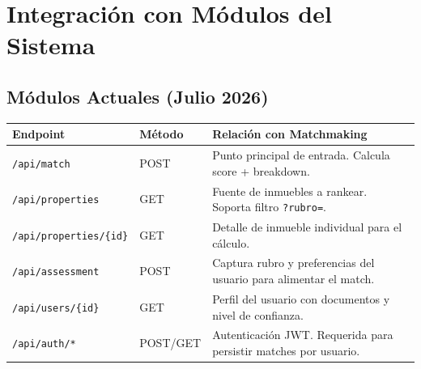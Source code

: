 \documentclass[11pt,a4paper]{article}
\begin{document}
\section{Integración con Módulos del Sistema}

\subsection{Módulos Actuales (Julio 2026)}
\begin{table}[H]
    \centering
    \renewcommand{\arraystretch}{1.2}
    \begin{tabularx}{\textwidth}{>{\hsize=0.25\hsize}X >{\hsize=0.15\hsize}X >{\hsize=0.6\hsize}X}
        \toprule
        \textbf{Endpoint} & \textbf{Método} & \textbf{Relación con Matchmaking} \\
        \midrule
        \texttt{/api/match} & POST & Punto principal de entrada. Calcula score + breakdown. \\
        \texttt{/api/properties} & GET & Fuente de inmuebles a rankear. Soporta filtro \texttt{?rubro=}. \\
        \texttt{/api/properties/\{id\}} & GET & Detalle de inmueble individual para el cálculo. \\
        \texttt{/api/assessment} & POST & Captura rubro y preferencias del usuario para alimentar el match. \\
        \texttt{/api/users/\{id\}} & GET & Perfil del usuario con documentos y nivel de confianza. \\
        \texttt{/api/auth/*} & POST/GET & Autenticación JWT. Requerida para persistir matches por usuario. \\
        \bottomrule
    \end{tabularx}
\end{table}
\end{document}
